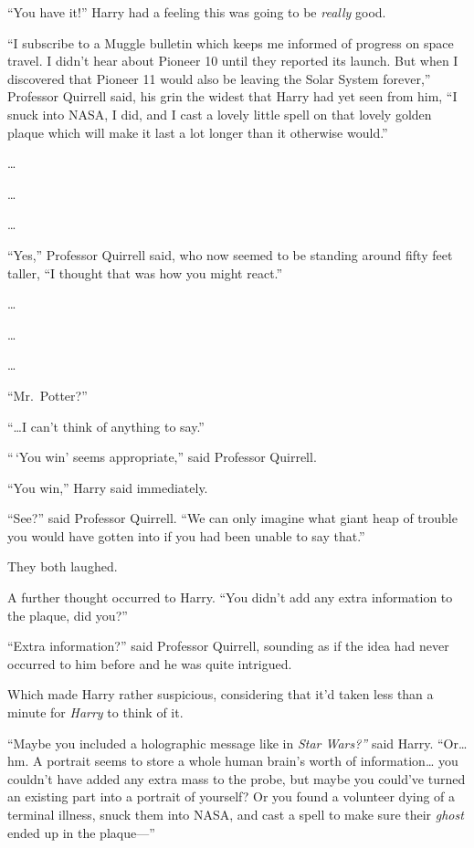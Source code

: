``You have it!'' Harry had a feeling this was going to be \emph{really}
good.

``I subscribe to a Muggle bulletin which keeps me informed of progress
on space travel. I didn't hear about Pioneer 10 until they reported its
launch. But when I discovered that Pioneer 11 would also be leaving the
Solar System forever,'' Professor Quirrell said, his grin the widest
that Harry had yet seen from him, ``I snuck into NASA, I did, and I cast
a lovely little spell on that lovely golden plaque which will make it
last a lot longer than it otherwise would.''

\ldots{}

\ldots{}

\ldots{}

``Yes,'' Professor Quirrell said, who now seemed to be standing around
fifty feet taller, ``I thought that was how you might react.''

\ldots{}

\ldots{}

\ldots{}

``Mr.~Potter?''

``\ldots{}I can't think of anything to say.''

``\,`You win' seems appropriate,'' said Professor Quirrell.

``You win,'' Harry said immediately.

``See?'' said Professor Quirrell. ``We can only imagine what giant heap
of trouble you would have gotten into if you had been unable to say
that.''

They both laughed.

A further thought occurred to Harry. ``You didn't add any extra
information to the plaque, did you?''

``Extra information?'' said Professor Quirrell, sounding as if the idea
had never occurred to him before and he was quite intrigued.

Which made Harry rather suspicious, considering that it'd taken less
than a minute for \emph{Harry} to think of it.

``Maybe you included a holographic message like in \emph{Star Wars?''}
said Harry. ``Or\ldots{} hm. A portrait seems to store a whole human
brain's worth of information\ldots{} you couldn't have added any extra
mass to the probe, but maybe you could've turned an existing part into a
portrait of yourself? Or you found a volunteer dying of a terminal
illness, snuck them into NASA, and cast a spell to make sure their
\emph{ghost} ended up in the plaque---''

